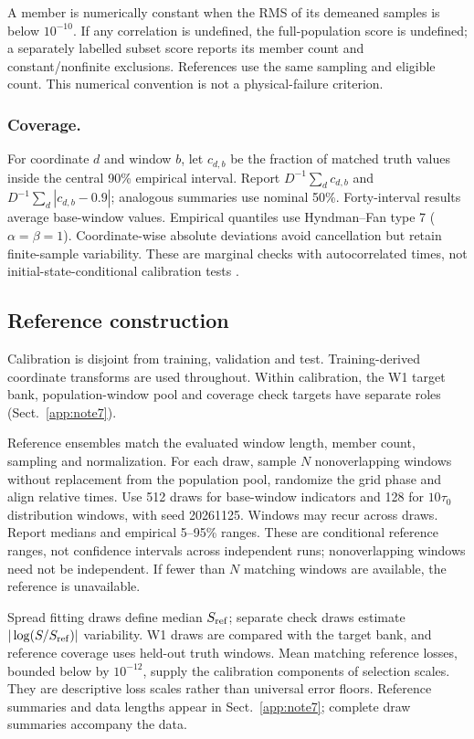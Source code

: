 \documentclass[gmd,manuscript]{copernicus}
\begin{document}
A member is numerically constant when the RMS of its demeaned samples is below $10^{-10}$. If any correlation is undefined, the full-population score is undefined; a separately labelled subset score reports its member count and constant/nonfinite exclusions. References use the same sampling and eligible count. This numerical convention is not a physical-failure criterion.

\subsubsection{Coverage.}
For coordinate $d$ and window $b$, let $c_{d,b}$ be the fraction of matched truth values inside the central 90\% empirical interval. Report $D^{-1}\sum_d c_{d,b}$ and $D^{-1}\sum_d|c_{d,b}-0.9|$; analogous summaries use nominal 50\%. Forty-interval results average base-window values. Empirical quantiles use Hyndman--Fan type 7 ($\alpha=\beta=1$). Coordinate-wise absolute deviations avoid cancellation but retain finite-sample variability. These are marginal checks with autocorrelated times, not initial-state-conditional calibration tests \citep{gneiting2007calibration}.


\subsection{Reference construction}\label{app:note2}
Calibration is disjoint from training, validation and test. Training-derived coordinate transforms are used throughout. Within calibration, the W1 target bank, population-window pool and coverage check targets have separate roles (Sect.~\ref{app:note7}).

Reference ensembles match the evaluated window length, member count, sampling and normalization. For each draw, sample $N$ nonoverlapping windows without replacement from the population pool, randomize the grid phase and align relative times. Use 512 draws for base-window indicators and 128 for $10\tau_0$ distribution windows, with seed 20261125. Windows may recur across draws. Report medians and empirical 5--95\% ranges. These are conditional reference ranges, not confidence intervals across independent runs; nonoverlapping windows need not be independent. If fewer than $N$ matching windows are available, the reference is unavailable.

Spread fitting draws define median $S_{\rm ref}$; separate check draws estimate $|\log(S/S_{\rm ref})|$ variability. W1 draws are compared with the target bank, and reference coverage uses held-out truth windows. Mean matching reference losses, bounded below by $10^{-12}$, supply the calibration components of selection scales. They are descriptive loss scales rather than universal error floors. Reference summaries and data lengths appear in Sect.~\ref{app:note7}; complete draw summaries accompany the data.
\end{document}
